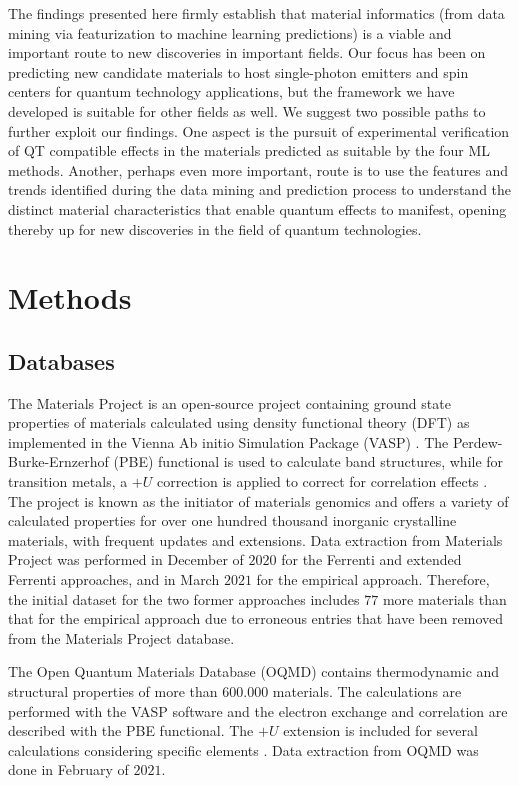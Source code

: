 \documentclass[superscriptaddress,unsortedaddress,
 amsmath,amssymb,
 aps,
]{revtex4-2}
\begin{document}
The findings presented here firmly establish that material informatics (from data mining via featurization to machine learning predictions) is a viable and important route to new discoveries in important fields.  Our focus has been on predicting new candidate materials to host single-photon emitters and spin centers for quantum technology applications, but the framework we have developed is suitable for other fields as well. 
We suggest two possible paths to further exploit our findings. One aspect is the pursuit of experimental verification of QT compatible effects in the materials predicted as suitable by the four ML methods. Another, perhaps even more important, route is to use the features and trends identified during the data mining and prediction process to understand the distinct material characteristics that enable quantum effects to manifest, opening  thereby up for new discoveries in the field of quantum technologies. 


\section*{Methods}

\subsection*{Databases}
The Materials Project \cite{Jain2013, Jain2018} is an open-source project containing ground state properties of materials calculated using density functional theory (DFT) as implemented in the Vienna Ab initio Simulation Package (VASP) \cite{Kresse1996}. The Perdew-Burke-Ernzerhof \cite{Perdew1996} (PBE) functional is used to calculate band structures, while for transition metals, a $+U$ correction is applied to correct for correlation effects \cite{Wang2006}. The project is known as the initiator of materials genomics and offers a variety of calculated properties for over one hundred thousand inorganic crystalline materials, with frequent updates and extensions. Data extraction from Materials Project was performed in December of $2020$ for the Ferrenti and extended Ferrenti approaches, and in March $2021$ for the empirical approach. Therefore, the initial dataset for the two former approaches includes $77$ more materials than that for the empirical approach due to erroneous entries that have been removed from the Materials Project database.

The Open Quantum Materials Database (OQMD) \cite{Saal2013, Kirklin2015} contains thermodynamic and structural properties of more than $600.000$  materials. The calculations are performed with the VASP software and the electron exchange and correlation are described with the PBE functional. The $+U$ extension is included for several calculations considering specific elements \cite{Stevanovic2012}. Data extraction from OQMD was done in February of $2021$. 
\end{document}
